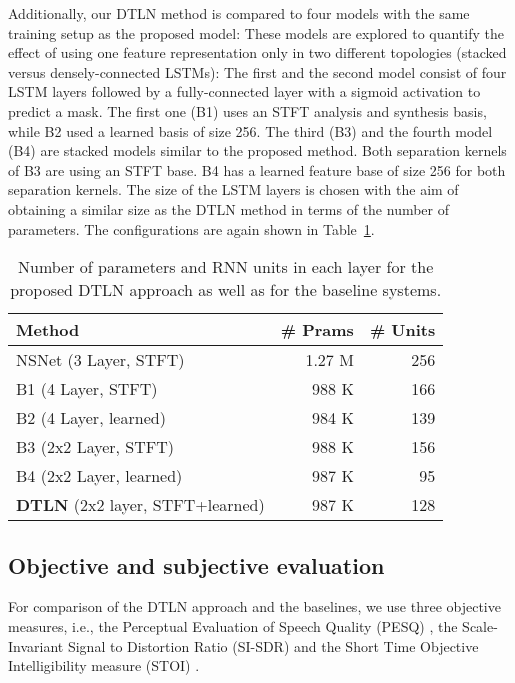 \documentclass[a4paper]{article}
\begin{document}
Additionally, our DTLN method is compared to four models with the same training setup as the proposed model: 
These models are explored to quantify the effect of using one feature representation only in two different topologies (stacked versus densely-connected LSTMs): 
The first and the second model consist of four LSTM layers followed by a fully-connected layer with a sigmoid activation to predict a mask. 
The first one (B1) uses an STFT analysis and synthesis basis, while B2 used a learned basis of size 256. The third (B3) and the fourth model (B4) are stacked models similar to the proposed method. Both separation kernels of B3 are using an STFT base. B4 has a learned feature base of size 256 for both separation kernels. 
The size of the LSTM layers is chosen with the aim of obtaining a similar size as the DTLN method in terms of the number of parameters. 
The configurations are again shown in Table~\ref{tab:models}. \\
\begin{table}[th]
  \caption{Number of parameters and RNN units in each layer for the proposed DTLN approach as well as for the baseline systems.}
  \label{tab:models}
  \centering
  \begin{tabular}{ l r r}
    \toprule
    \textbf{Method} & \textbf{\# Prams} & \textbf{\# Units}\\
    \midrule
     NSNet (3 Layer, STFT) &   1.27 M    &     256     \\
     \midrule
     B1 (4 Layer, STFT)    &   988 K     &     166    \\
     B2 (4 Layer, learned) &   984 K     &     139    \\
     B3 (2x2 Layer, STFT)  &   988 K     &     156    \\
     B4 (2x2 Layer, learned) &   987 K     &     95   \\
     \midrule
     \textbf{DTLN} (2x2 layer, STFT+learned)  &   987 K     &     128     \\
    
    \bottomrule
  \end{tabular}
  
\end{table}
\subsection{Objective and subjective evaluation}
For comparison of the DTLN approach and the baselines, we use three objective measures, i.e., the Perceptual Evaluation of Speech Quality (PESQ) \cite{pesq}, the Scale-Invariant Signal to Distortion Ratio (SI-SDR) \cite{le2019sdr} and the Short Time Objective Intelligibility measure (STOI) \cite{taal2010short}.
\end{document}
